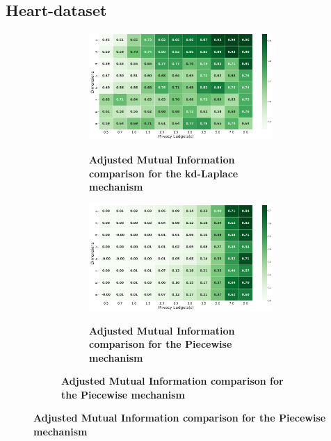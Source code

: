 \subsection{Heart-dataset}
\begin{figure}[H]
  \centering
  \begin{subfigure}[b]{0.90\textwidth}
    \begin{subfigure}[c]{1\textwidth}
      \caption{\textbf{Adjusted Mutual Information comparison for the kd-Laplace mechanism}}
      \includegraphics[width=1\textwidth]{Results/kd-laplace/kd-Laplace/heart-dataset/ami.png}
      \label{fig:ami_heart-dataset_comparison_kdlaplace_2d}
    \end{subfigure}
    \vfill %
    \begin{subfigure}[c]{1\textwidth}
      \caption{\textbf{Adjusted Mutual Information comparison for the Piecewise mechanism}}
      \includegraphics[width=1\textwidth]{Results/kd-laplace/piecewise/heart-dataset/ami.png}
      \label{fig:ami_heart-dataset_comparison_piecewise_2d}
    \end{subfigure}

\end{subfigure}
\end{figure}
